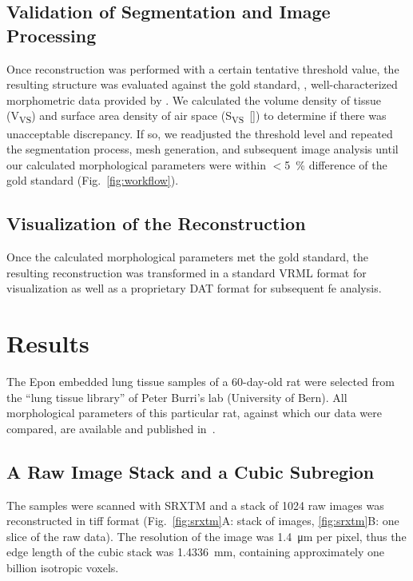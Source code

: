 \subsection[Validation of Segmentation]{Validation of Segmentation and Image Processing}
Once \threed reconstruction was performed with a certain tentative threshold value, the resulting \threed structure was evaluated against the gold standard, \ie, well-characterized morphometric data provided by \citet{Tschanz2003}. We calculated the volume density of tissue (V\textsubscript{VS}) and surface area density of air space (S\textsubscript{VS}~[\centimetresquared\per\centimetrecubed]) to determine if there was unacceptable discrepancy. If so, we readjusted the threshold level and repeated the segmentation process, mesh generation, and subsequent image analysis until our calculated morphological parameters were within $<$\SI{5}{\percent} difference of the gold standard (Fig.~\ref{fig:workflow}).

\subsection[Visualization of the Reconstruction]{Visualization of the \threed Reconstruction}
Once the calculated morphological parameters met the gold standard, the resulting \threed reconstruction was transformed in a standard \acs{VRML} format for visualization as well as a proprietary DAT format for subsequent \ac{fe} analysis.

\section{Results}
The Epon embedded lung tissue samples of a 60-day-old rat were selected from the ``lung tissue library'' of Peter Burri's lab (University of Bern). All morphological parameters of this particular rat, against which our data were compared, are available and published in~\citet{Tschanz2003}.

\subsection{A Raw Image Stack and a Cubic Subregion}
The samples were scanned with \ac{SRXTM} and a stack of 1024 raw images was reconstructed in tiff format (Fig.~\ref{fig:srxtm}A: stack of images, \ref{fig:srxtm}B: one slice of the raw data). The resolution of the image was \SI{1.4}{\micro\meter} per pixel, thus the edge length of the cubic stack was \SI{1.4336}{\milli\meter}, containing approximately one billion isotropic voxels.

